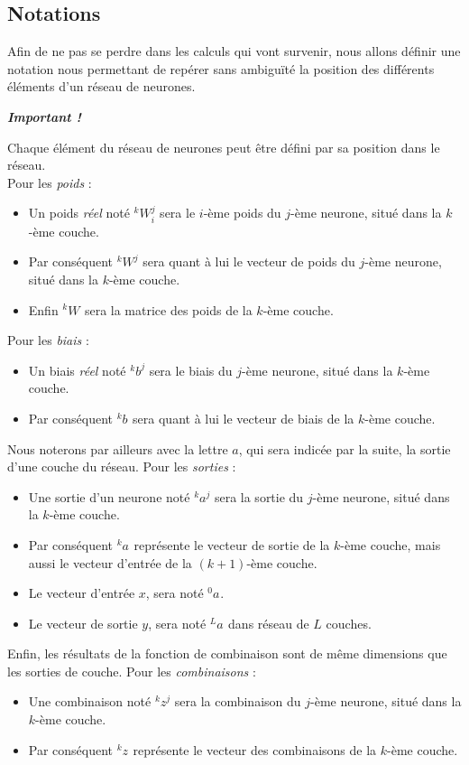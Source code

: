 \documentclass[a4paper, 10pt]{report}
\newcommand{\lexp}[1]{\phantom{}^{#1}}
\newcommand{\elem}[4]{\lexp{#2}#1^{#3}_{#4}}
\begin{document}
\subsection{Notations}
Afin de ne pas se perdre dans les calculs qui vont survenir, nous allons définir une notation nous permettant de repérer sans ambiguïté la position des différents éléments d'un réseau de neurones.
\begin{center}
	\emph{\textbf{Important !}}
\end{center}
Chaque élément du réseau de neurones peut être défini par sa position dans le réseau.\\
Pour les \emph{poids} :
\begin{itemize}
	\item Un poids \emph{réel} noté $\elem{W}{k}{j}{i}$ sera le $i$-ème poids du $j$-ème neurone, situé dans la $k$-ème couche.
	\item Par conséquent $\elem{W}{k}{j}{}$ sera quant à lui le vecteur de poids du $j$-ème neurone, situé dans la $k$-ème couche.
	\item Enfin $\elem{W}{k}{}{}$ sera la matrice des poids de la $k$-ème couche.
	      \end{itemize}
Pour les \emph{biais} :
\begin{itemize}
	\item Un biais \emph{réel} noté $\elem{b}{k}{j}{}$ sera le biais du $j$-ème neurone, situé dans la $k$-ème couche.
	\item Par conséquent $\elem{b}{k}{}{}$ sera quant à lui le vecteur de biais de la $k$-ème couche.
	      \end{itemize}
Nous noterons par ailleurs avec la lettre $a$, qui sera indicée par la suite, la sortie d'une couche du réseau.
Pour les \emph{sorties} :
\begin{itemize}
	\item Une sortie d'un neurone noté $\elem{a}{k}{j}{}$ sera la sortie du $j$-ème neurone, situé dans la $k$-ème couche.
	\item Par conséquent $\elem{a}{k}{}{}$ représente le vecteur de sortie de la $k$-ème couche, mais aussi le vecteur d'entrée de la $(k+1)$-ème couche.
	\item Le vecteur d'entrée $x$, sera noté $\elem{a}{0}{}{}$.
	\item Le vecteur de sortie $y$, sera noté $\elem{a}{L}{}{}$ dans réseau de $L$ couches.
	      \end{itemize}
Enfin, les résultats de la fonction de combinaison sont de même dimensions que les sorties de couche.
Pour les \emph{combinaisons} :
\begin{itemize}
	\item Une combinaison noté $\elem{z}{k}{j}{}$ sera la combinaison du $j$-ème neurone, situé dans la $k$-ème couche.
	\item Par conséquent $\elem{z}{k}{}{}$ représente le vecteur des combinaisons de la $k$-ème couche.
	      \end{itemize}
			
\end{document}
